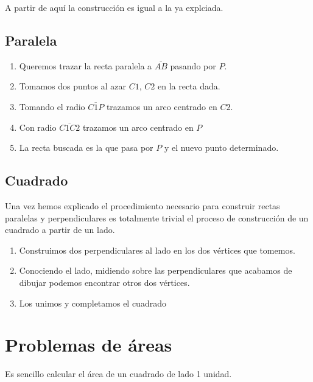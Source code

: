 \documentclass{apuntes}
\begin{document}
A partir de aquí la construcción es igual a la ya explciada.

\subsection{Paralela}

\begin{minipage}{0.4\textwidth}
\begin{center}
\end{center}
\end{minipage}
\begin{minipage}{0.57\textwidth}
\begin{enumerate}
\item Queremos trazar la recta paralela a $\overline{AB}$ pasando por $P$.
\item Tomamos dos puntos al azar $C1$, $C2$ en la recta dada.
\item Tomando el radio $\overline{C1P}$ trazamos un arco centrado en $C2$.
\item Con radio $\overline{C1C2}$ trazamos un arco centrado en $P$
\item La recta buscada es la que pasa por $P$ y el nuevo punto determinado.
\end{enumerate}
\end{minipage}

\subsection{Cuadrado}
Una vez hemos explicado el procedimiento necesario para construir rectas paralelas y perpendiculares es totalmente trivial el proceso de construcción de un cuadrado a partir de un lado.

\begin{enumerate}
\item Construimos dos perpendiculares al lado en los dos vértices que tomemos.
\item Conociendo el lado, midiendo sobre las perpendiculares que acabamos de dibujar podemos encontrar otros dos vértices.
\item Los unimos y completamos el cuadrado
\end{enumerate}

\section{Problemas de áreas}
Es sencillo calcular el área de un cuadrado de lado 1 unidad.
\end{document}
